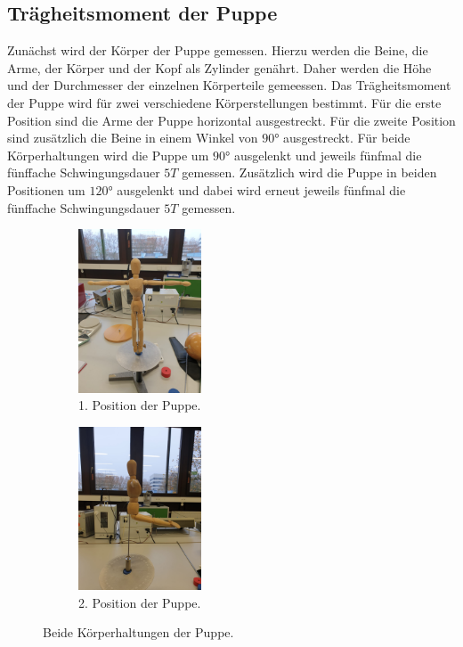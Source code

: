 \subsection{Trägheitsmoment der Puppe}
\label{sec:TragheitPuppe}
%
Zunächst wird der Körper der Puppe gemessen. Hierzu werden die Beine, die Arme, der Körper und der Kopf als Zylinder
genährt. Daher werden die Höhe und der Durchmesser der einzelnen Körperteile gemeessen. Das Trägheitsmoment der Puppe wird 
für zwei verschiedene Körperstellungen bestimmt. Für die erste Position sind die Arme der Puppe horizontal ausgestreckt. 
Für die zweite Position sind zusätzlich die Beine in einem Winkel von $90°$ ausgestreckt. Für beide Körperhaltungen wird 
die Puppe um $90°$ ausgelenkt und jeweils fünfmal die fünffache Schwingungsdauer $5T$ gemessen. Zusätzlich wird die Puppe 
in beiden Positionen um $120°$ ausgelenkt und dabei wird erneut jeweils fünfmal die fünffache Schwingungsdauer $5T$ gemessen. 
%
\begin{figure}
    \centering
    \begin{subfigure}{0.5\textwidth}
      \centering
      \includegraphics[width=0.4\textwidth]{Position_1.jpeg}
      \caption{1. Position der Puppe.}
      \label{fig:sub1}
    \end{subfigure}%
    \begin{subfigure}{0.5\textwidth}
      \centering
      \includegraphics[width=0.4\textwidth]{Position_2.jpg}
      \caption{2. Position der Puppe.}
      \label{fig:sub2}
    \end{subfigure}
    \caption{Beide Körperhaltungen der Puppe.}
    \label{fig:test}
\end{figure}